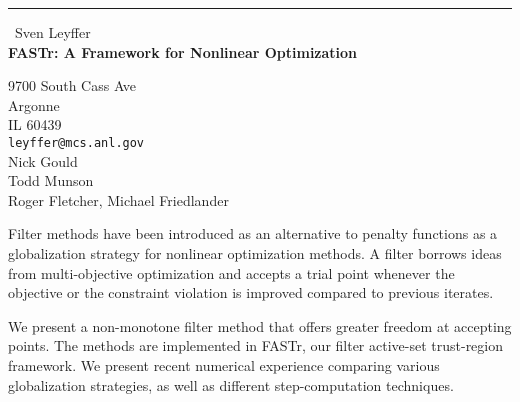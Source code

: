 \documentclass{report}
\begin{document}
\begin{center}
\rule{6in}{1pt} \
{\large Sven Leyffer \\
{\bf FASTr: A Framework for Nonlinear Optimization}}

9700 South Cass Ave \\ Argonne \\ IL 60439
\\
{\tt leyffer@mcs.anl.gov}\\
Nick Gould\\
Todd Munson\\
	Roger Fletcher, Michael Friedlander\end{center}

Filter methods have been introduced as an alternative to penalty
functions as a globalization strategy for nonlinear optimization methods.
A filter borrows ideas from multi-objective optimization and accepts a
trial point whenever the objective or the constraint violation is
improved compared to previous iterates.

We present a non-monotone filter method that offers greater freedom at
accepting points. The methods are implemented in FASTr, our filter
active-set trust-region framework. We present recent numerical experience
comparing various globalization strategies, as well as different
step-computation techniques.
\end{document}
